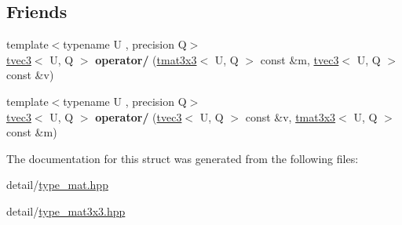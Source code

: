 \subsection*{Friends}
\begin{DoxyCompactItemize}
\item 
\hypertarget{structglm_1_1tmat3x3_ac84f82f1605a6094a397c84daa80a201}{{\footnotesize template$<$typename U , precision Q$>$ }\\\hyperlink{structglm_1_1tvec3}{tvec3}$<$ U, Q $>$ {\bfseries operator/} (\hyperlink{structglm_1_1tmat3x3}{tmat3x3}$<$ U, Q $>$ const \&m, \hyperlink{structglm_1_1tvec3}{tvec3}$<$ U, Q $>$ const \&v)}\label{structglm_1_1tmat3x3_ac84f82f1605a6094a397c84daa80a201}

\item 
\hypertarget{structglm_1_1tmat3x3_a62cedcc444ac62727b8ae82f6b3249b8}{{\footnotesize template$<$typename U , precision Q$>$ }\\\hyperlink{structglm_1_1tvec3}{tvec3}$<$ U, Q $>$ {\bfseries operator/} (\hyperlink{structglm_1_1tvec3}{tvec3}$<$ U, Q $>$ const \&v, \hyperlink{structglm_1_1tmat3x3}{tmat3x3}$<$ U, Q $>$ const \&m)}\label{structglm_1_1tmat3x3_a62cedcc444ac62727b8ae82f6b3249b8}

\end{DoxyCompactItemize}


The documentation for this struct was generated from the following files\-:\begin{DoxyCompactItemize}
\item 
detail/\hyperlink{type__mat_8hpp}{type\-\_\-mat.\-hpp}\item 
detail/\hyperlink{type__mat3x3_8hpp}{type\-\_\-mat3x3.\-hpp}\end{DoxyCompactItemize}
